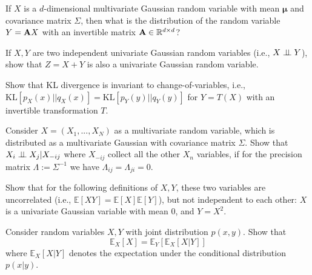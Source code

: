 \begin{question} 
\label{q:linear_transform_gaussian}

If $X$ is a $d$-dimensional multivariate Gaussian random variable with mean $\bm{\mu}$ and covariance matrix $\Sigma$, then what is the distribution of the random variable $Y = \mathbf A X$ with an invertible matrix $\mathbf A \in \mathbb{R}^{d \times d}$? 
\end{question}

\begin{question}
\label{q:sum_of_gaussians}

If $X, Y$ are two independent univariate Gaussian random variables (i.e., $X \perp\!\!\!\perp Y$), show that $Z = X+Y$ is also a univariate Gaussian random variable.
\end{question}

\begin{question}
\label{q:kl_change_of_variable}

Show that KL divergence is invariant to change-of-variables, i.e., $\mathrm{KL}[p_X(x) || q_X(x)] = \mathrm{KL}[p_Y(y) || q_Y(y)]$ for $Y = T(X)$ with an invertible transformation $T$.
\end{question}

\begin{question}
\label{q:independence_of_gaussians}

Consider $X = (X_1, ..., X_N)$ as a multivariate random variable, which is distributed as a multivariate Gaussian with covariance matrix $\Sigma$. Show that $X_i \perp\!\!\!\perp X_j | X_{-ij}$ where $X_{-ij}$ collect all the other $X_n$ variables, if for the precision matrix $\Lambda := \Sigma^{-1}$ we have $\Lambda_{ij} = \Lambda_{ji} = 0$.
\end{question}

\begin{question}
\label{q:uncorrelated}

Show that for the following definitions of $X, Y$, these two variables are uncorrelated (i.e., $\mathbb{E}[XY] = \mathbb{E}[X]\mathbb{E}[Y]$), but not independent to each other: $X$ is a univariate Gaussian variable with mean 0, and $Y = X^2$. 

\end{question}


\begin{question}
\label{q:mml-6.11}

Consider random variables $X,Y$ with joint distribution $p(x,y)$. Show that
\begin{equation}
\mathbb{E}_X[X]= \mathbb{E}_Y[\mathbb{E}_X [X|Y]]
\end{equation}
where $\mathbb{E}_X [X|Y]$ denotes the expectation under the conditional distribution $p(x|y)$.
\end{question}

